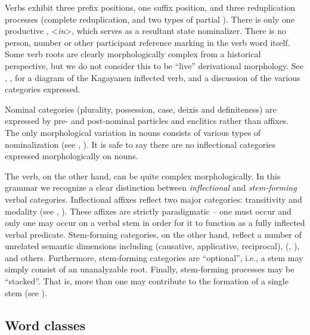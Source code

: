Verbs  exhibit three prefix positions, one suffix position, and three reduplication processes (complete reduplication, and two types of partial ). There is only one productive , <\textit{in}>, which serves as a resultant state nominalizer. There is no person, number or other participant reference marking in the verb word itself. Some verb roots are clearly morphologically complex from a historical perspective, but we do not consider this to be “live” derivational morphology. See , , for a diagram of the Kagayanen inflected verb, and a discussion of the various categories expressed.

Nominal categories (plurality, possession, case, deixis and definiteness) are expressed by pre- and post-nominal particles and enclitics rather than affixes. The only morphological variation in nouns consists of various types of nominalization (see , ). It is safe to say there are no inflectional  categories expressed morphologically on nouns.

The verb, on the other hand, can be quite complex morphologically. In this grammar we recognize a clear distinction between \textit{inflectional} and \textit{stem-forming} verbal categories. Inflectional affixes reflect two major categories: transitivity and modality  (see , ). These affixes are strictly paradigmatic – one must occur and only one may occur on a verbal stem in order for it to function as a fully inflected verbal predicate. Stem-forming categories, on the other hand, reflect a number of unrelated semantic dimensions including  (causative, applicative, reciprocal),  (, ), and others. Furthermore, stem-forming categories are “optional”, i.e., a stem may simply consist of an unanalyzable root. Finally, stem-forming processes may be “stacked”. That is, more than one may contribute to the formation of a single stem (see ).  

\subsection{Word classes}\label{sec:1.6.2} \label{sec:wordclasses}

